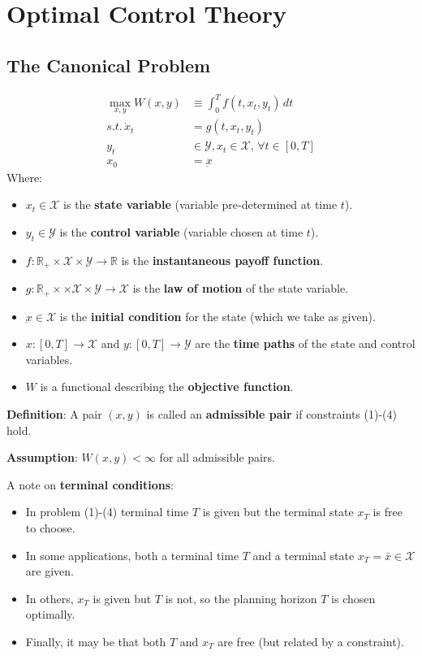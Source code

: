 \section{Optimal Control Theory}

\subsection{The Canonical Problem}

\begin{align}
    \max_{x,y} W(x,y) & \equiv \int_{0}^{T} f(t,x_t,y_t) \, dt                       \\
    s.t. \, \dot{x}_t & = g(t,x_t,y_t)                                               \\
    y_t               & \in \mathcal{Y}, x_t \in \mathcal{X}, \, \forall t \in [0,T] \\
    x_0               & = \underbar{x}
\end{align}
Where: \begin{itemize}
    \item $x_t \in \mathcal{X}$ is the \textbf{state variable} (variable pre-determined at time $t$).
    \item $y_t \in \mathcal{Y}$ is the \textbf{control variable} (variable chosen at time $t$).
    \item $f: \mathbb{R}_+ \times \mathcal{X} \times \mathcal{Y} \to \mathbb{R}$ is the \textbf{instantaneous payoff function}.
    \item $g: \mathbb{R}_+ \times \times \mathcal{X} \times \mathcal{Y} \to \mathcal{X}$ is the \textbf{law of motion} of the state variable.
    \item $\underbar{x} \in \mathcal{X}$ is the \textbf{initial condition} for the state (which we take as given).
    \item $x: [0,T] \to \mathcal{X}$ and $y: [0,T] \to \mathcal{Y}$ are the \textbf{time paths} of the state and control variables.
    \item $W$ is a functional describing the \textbf{objective function}.
\end{itemize}

\textbf{Definition}: A pair $(x,y)$ is called an \textbf{admissible pair} if constraints (1)-(4) hold.

\textbf{Assumption}: $W(x,y) < \infty $ for all admissible pairs.


A note on \textbf{terminal conditions}: \begin{itemize}
    \item In problem (1)-(4) terminal time $T$ is given but the terminal state $x_T$ is free to choose.
    \item In some applications, both a terminal time $T$ and a terminal state $x_T = \bar{x} \in \mathcal{X}$ are given.
    \item In others, $x_T$ is given but $T$ is not, so the planning horizon $T$ is chosen optimally.
    \item Finally, it may be that both $T$ and $x_T$ are free (but related by a constraint).
\end{itemize}

